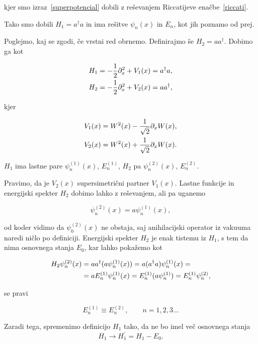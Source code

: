 kjer smo izraz~\eqref{superpotencial} dobili z re\v sevanjem Riccatijeve ena\v cbe~\eqref{riccati}.

Tako smo dobili $H_1 = a^\dagger a$ in ima re\v sitve $\psi_n(x)$ in $E_n$, kot jih poznamo
od prej.

Poglejmo, kaj se zgodi, \v ce vrstni red obrnemo. Definirajmo \v se $H_2 = aa^\dagger$. Dobimo ga kot

\begin{align}
	H_1 &= -\frac{1}{2}\partial_x^2 + V_1(x) = a^\dagger a, \\
	H_2 &= -\frac{1}{2}\partial_x^2 + V_2(x) = aa^\dagger,
\end{align}

kjer

\begin{align}
	V_1(x) &= W^2(x) - \frac{1}{\sqrt{2}}\partial_x W(x), \\
	V_2(x) &= W^2(x) + \frac{1}{\sqrt{2}}\partial_x W(x).
\end{align}

$H_1$ ima lastne pare $\psi^{(1)}_n(x)$, $E^{(1)}_n$, $H_2$ pa $\psi^{(2)}_n(x)$, $E^{(2)}_n$.

Pravimo, da je $V_2(x)$ supersimetri\v cni partner $V_1(x)$. Lastne funkcije in energijski spekter $H_2$
dobimo lahko z re\v sevanjem, ali pa uganemo

\begin{equation}
	\psi^{(2)}_n(x) = a\psi^{(1)}_n(x),
\end{equation}

od koder vidimo da $\psi^{(2)}_0(x)$ ne obstaja, saj anihilacijski operator iz vakuuma naredi
ni\v clo po definiciji. Energijski spekter $H_2$ je enak tistemu iz $H_1$, s tem da nima
osnovnega stanja $E_0$, kar lahko poka\v zemo kot

\begin{align}
	H_2\psi^{(2)}_n(x) &= aa^\dagger (a\psi^{(1)}_n(x)) = a(a^\dagger a)\psi^{(1)}_n(x) = \notag \\
		&= aE^{(1)}_n\psi^{(1)}_n(x) = E_n^{(1)}(a\psi_n^{(1)}) = E_n^{(1)}\psi_n^{(2)},
\end{align}

se pravi

\begin{equation}
	E^{(1)}_n \equiv E^{(2)}_n, \qquad n = 1, 2, 3 \ldots
\end{equation}

Zaradi tega, spremenimo definicijo $H_1$ tako, da ne bo imel ve\v c osnovnega stanja
\begin{equation}
	H_1 \to H_1^\prime = H_1 - E_0.
\end{equation}

